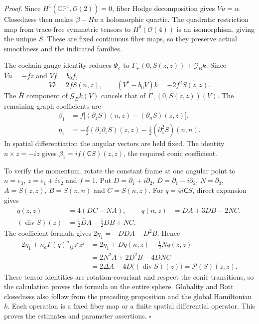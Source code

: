\documentclass[
  english,
  11pt,
  reqno]{amsart}
\begin{document}
\emph{Proof.} Since \(H^1(\mathbb{CP}^1,\mathcal O(2))=0\), fiber Hodge
decomposition gives \(Vu=\alpha\). Closedness then makes \(\beta-Hu\) a
holomorphic quartic. The quadratic restriction map from trace-free
symmetric tensors to \(H^0(\mathcal O(4))\) is an isomorphism, giving
the unique \(S\). These are fixed continuous fiber maps, so they
preserve actual smoothness and the indicated families.

The cochain-gauge identity reduces \(\Psi_e\) to
\(\Gamma_+(0,S(z,z))+\mathcal G_Bk\). Since \(Vn=-fz\) and \(Vf=b_0f\),
\[
Vk=2fS(n,z),\qquad
(V^2-b_0V)k=-2f^2S(z,z).
\] The \(\bar H\) component of \(\mathcal G_Bk(V)\) cancels that of
\(\Gamma_+(0,S(z,z))(V)\). The remaining graph coefficients are%
\[
\begin{aligned}
\beta_1&=f\bigl[(\partial_zS)(n,z)-(\partial_nS)(z,z)\bigr],\\
\eta_1&=-\frac f2(\partial_{\bar z}\partial_zS)(z,z)
        -\frac12(\partial_z^2S)(n,n).
\end{aligned}
\] In spatial differentiation the angular vectors are held fixed. The
identity \(n\times z=-iz\) gives \(\beta_1=if(\mathsf CS)(z,z)\), the
required conic coefficient.

To verify the momentum, rotate the constant frame at one angular point
to \(n=e_3\), \(z=e_1+ie_2\) and \(f=1\). Put
\(D=\partial_1+i\partial_2\), \(\bar D=\partial_1-i\partial_2\),
\(N=\partial_3\), \(A=S(z,z)\), \(B=S(n,n)\) and \(C=S(n,z)\). For
\(q=4i\mathsf CS\), direct expansion gives \[
\begin{aligned}
q(z,z)&=4(DC-NA),&
q(n,z)&=\bar DA+3DB-2NC,\\
(\operatorname{div}S)(z)&=\tfrac12\bar DA-\tfrac12DB+NC.
\end{aligned}
\] The coefficient formula gives \(2\eta_1=-\bar DDA-D^2B\). Hence \[
\begin{aligned}
2\eta_1+n_a\Gamma(q)^a{}_{ij}z^iz^j
&=2\eta_1+Dq(n,z)-\tfrac12Nq(z,z)\\
&=2N^2A+2D^2B-4DNC\\
&=2\Delta A-4D\bigl((\operatorname{div}S)(z)\bigr)
=\mathcal P(S)(z,z).
\end{aligned}
\] These tensor identities are rotation-covariant and respect the conic
transitions, so the calculation proves the formula on the entire sphere.
Globality and Bott closedness also follow from the preceding proposition
and the global Hamiltonian \(k\). Each operation is a fixed fiber map or
a finite spatial differential operator. This proves the estimates and
parameter assertions. \hfill\(\square\)
\end{document}
